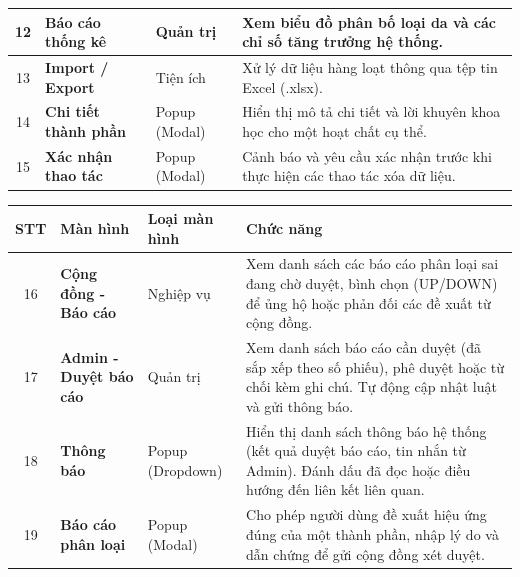 \documentclass[12pt,a4paper]{article}
\begin{document}
\begin{center}
\begin{tabularx}{\textwidth}{|c|l|l|X|}
12 & \textbf{Báo cáo thống kê} & Quản trị & Xem biểu đồ phân bố loại da và các chỉ số tăng trưởng hệ thống. \\ \hline

13 & \textbf{Import / Export} & Tiện ích & Xử lý dữ liệu hàng loạt thông qua tệp tin Excel (.xlsx). \\ \hline

14 & \textbf{Chi tiết thành phần} & Popup (Modal) & Hiển thị mô tả chi tiết và lời khuyên khoa học cho một hoạt chất cụ thể. \\ \hline

15 & \textbf{Xác nhận thao tác} & Popup (Modal) & Cảnh báo và yêu cầu xác nhận trước khi thực hiện các thao tác xóa dữ liệu. \\ \hline



\end{tabularx}
\end{center}




\begin{center}
\renewcommand{\arraystretch}{1.5}
\begin{tabularx}{\textwidth}{|c|l|l|X|}
\hline
\rowcolor{blue!20}
\textbf{STT} & \textbf{Màn hình} & \textbf{Loại màn hình} & \textbf{Chức năng} \\ \hline
16 & \textbf{Cộng đồng - Báo cáo} & Nghiệp vụ & Xem danh sách các báo cáo phân loại sai đang chờ duyệt, bình chọn (UP/DOWN) để ủng hộ hoặc phản đối các đề xuất từ cộng đồng. \\ \hline

17 & \textbf{Admin - Duyệt báo cáo} & Quản trị & Xem danh sách báo cáo cần duyệt (đã sắp xếp theo số phiếu), phê duyệt hoặc từ chối kèm ghi chú. Tự động cập nhật luật và gửi thông báo. \\ \hline

18 & \textbf{Thông báo} & Popup (Dropdown) & Hiển thị danh sách thông báo hệ thống (kết quả duyệt báo cáo, tin nhắn từ Admin). Đánh dấu đã đọc hoặc điều hướng đến liên kết liên quan. \\ \hline

19 & \textbf{Báo cáo phân loại} & Popup (Modal) & Cho phép người dùng đề xuất hiệu ứng đúng của một thành phần, nhập lý do và dẫn chứng để gửi cộng đồng xét duyệt. \\ \hline

\end{tabularx}
\end{center}
\end{document}
